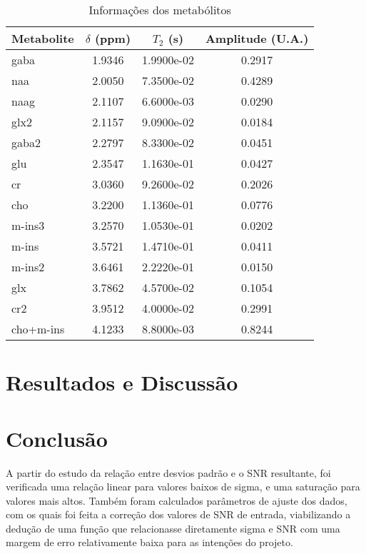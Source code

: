 \documentclass{article}
\begin{document}
\begin{table}[H]
    \centering
    \begin{tabular}{|l|c|c|c|}
    \hline
    Metabolite & $\delta$ (ppm) & $T_2$ (s) & Amplitude (U.A.) \\
    \hline
    gaba & 1.9346 & 1.9900e-02 & 0.2917 \\
    naa & 2.0050 & 7.3500e-02 & 0.4289 \\
    naag & 2.1107 & 6.6000e-03 & 0.0290 \\
    glx2 & 2.1157 & 9.0900e-02 & 0.0184 \\
    gaba2 & 2.2797 & 8.3300e-02 & 0.0451 \\
    glu & 2.3547 & 1.1630e-01 & 0.0427 \\
    cr & 3.0360 & 9.2600e-02 & 0.2026 \\
    cho & 3.2200 & 1.1360e-01 & 0.0776 \\
    m-ins3 & 3.2570 & 1.0530e-01 & 0.0202 \\
    m-ins & 3.5721 & 1.4710e-01 & 0.0411 \\
    m-ins2 & 3.6461 & 2.2220e-01 & 0.0150 \\
    glx & 3.7862 & 4.5700e-02 & 0.1054 \\
    cr2 & 3.9512 & 4.0000e-02 & 0.2991 \\
    cho+m-ins & 4.1233 & 8.8000e-03 & 0.8244 \\
    \hline
    \end{tabular}
    \caption{Informações dos metabólitos}
\end{table}

\section{Resultados e Discussão}

\section{Conclusão}

A partir do estudo da relação entre desvios padrão e o SNR resultante, 
foi verificada uma relação linear para valores baixos de sigma, e uma 
saturação para valores mais altos. Também foram calculados 
parâmetros de ajuste dos dados, com os quais foi feita a correção dos 
valores de SNR de entrada, viabilizando a dedução de uma função que 
relacionasse diretamente sigma e SNR com uma margem de erro 
relativamente baixa para as intenções do projeto.


\end{document}
